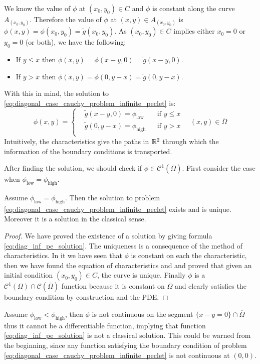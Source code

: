 We know the value of $\phi$ at $(x_0,y_0) \in C$ and $\phi$ is constant along
the curve $A_{(x_0,y_0)}$. Therefore the value of $\phi$ at $(x,y) \in
A_{(x_0,y_0)}$ is $\phi(x,y) = \phi(x_0,y_0) = \tilde{g}(x_0,y_0)$. As
$(x_0,y_0) \in C$ implies either $x_0 = 0$ or $y_0 = 0$ (or both), we have the following:
\begin{itemize}[topsep=0pt]
	\item If $y \leq x$ then $\phi(x,y) = \phi(x-y,0) = \tilde{g}(x-y,0)$.
	\item If $y > x$ then $\phi(x,y) = \phi(0,y-x) = \tilde{g}(0,y-x)$.
\end{itemize}
With this in mind, the solution to \eqref{eq:diagonal_case_cauchy_problem_infinite_peclet} is:
\begin{equation} \label{eq:diag_inf_pe_solution}
	\phi(x,y) = 
	\left\{
		\begin{aligned}
			&\tilde{g}(x-y,0) = \phi_\text{low} & &\text{if } y \leq x \\
			&\tilde{g}(0,y-x) = \phi_\text{high} & &\text{if } y > x \\
		\end{aligned}
	\right.
	\quad
	(x,y) \in \overline{\Omega}
\end{equation}
Intuitively, the characteristics give the paths in $\mathbb{R}^2$ through which the
information of the boundary conditions is transported. 

After finding the solution, we should check if $\phi \in
\mathcal{C}^1(\overline{\Omega})$. First consider the case when $\phi_\text{low}
= \phi_\text{high}$.

\begin{theorem}
	Assume $\phi_\text{low} = \phi_\text{high}$. Then the solution to problem
	\eqref{eq:diagonal_case_cauchy_problem_infinite_peclet} exists and is
	unique. Moreover it is a solution in the classical sense.
\end{theorem}
\begin{proof}
	We have proved the existence of a solution by giving formula
	\eqref{eq:diag_inf_pe_solution}. The uniqueness is a consequence of the
	method of characteristics. In it we have seen that $\phi$ is constant on
	each the characteristic, then we have found the equation of characteristics
	and and proved that given an initial condition $(x_0,y_0) \in C$, the curve
	is unique. Finally $\phi$ is a $\mathcal{C}^1(\Omega) \cap
	\mathcal{C}(\overline{\Omega})$ function because it is constant on
	$\overline{\Omega}$ and clearly satisfies the boundary condition by
	construction and the PDE.
\end{proof}

Assume $\phi_\text{low} < \phi_\text{high}$, then $\phi$ is not continuous on
the segment $\{ x - y = 0 \} \cap \overline{\Omega}$ thus it cannot be a
differentiable function, implying that function \eqref{eq:diag_inf_pe_solution}
is not a classical solution. This could be warned from the beginning, since any
function satisfying the boundary condition of problem
\eqref{eq:diagonal_case_cauchy_problem_infinite_peclet} is not continuous at
$(0,0)$.

